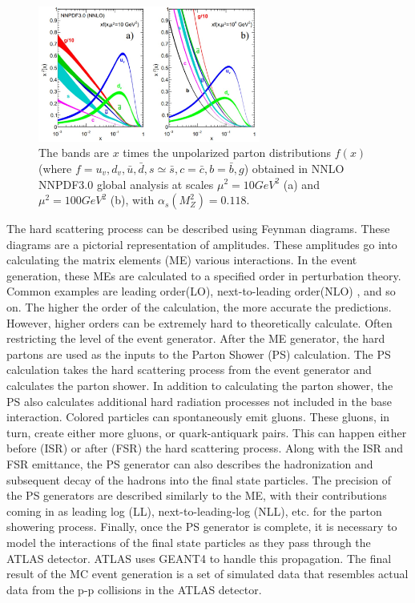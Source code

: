 \begin{figure}[h]
\begin{center}
\includegraphics*[width=0.65\textwidth] {figures/pdf.jpg}
\caption{The bands are ${x}$ times the unpolarized parton distributions
${f(x)}$ (where ${f = u_{v}, d_{v}, \bar{u}, \bar{d}, s \simeq{} \bar{s}, c = \bar{c}, b = \bar{b}, g}$) obtained in NNLO NNPDF3.0
global analysis at scales ${\mu^{2} = 10  GeV^{2}}$
(a) and ${\mu^{2} = 100  GeV^{2}}$ (b), with
${\alpha_{s}(M^{2}_{Z}) = 0.118}$.}
\label{fig:pdf}
\end{center}
\end{figure}


\indent The hard scattering process can be described using Feynman diagrams. These diagrams are a pictorial representation of amplitudes. These amplitudes go into calculating the matrix elements (ME) various interactions. In the event generation, these MEs are calculated to a specified order in perturbation theory. Common examples are leading order(LO), next-to-leading order(NLO) , and so on. The higher the order of the calculation, the more accurate the predictions. However, higher orders can be extremely hard to theoretically calculate. Often restricting the level of the event generator. \newline
\indent  After the ME generator, the hard partons are used as the inputs to the Parton Shower (PS) calculation. The PS calculation takes the hard scattering process from the event generator and calculates the parton shower. In addition to calculating the parton shower, the PS also calculates additional hard radiation processes not included in the base interaction. Colored particles can spontaneously emit gluons. These gluons, in turn, create either more gluons, or quark-antiquark pairs. This can happen either before (ISR) or after (FSR) the hard scattering process. Along with the ISR and FSR emittance, the PS generator can also describes the hadronization and subsequent decay of the hadrons into the final state particles. The precision of the PS generators are described similarly to the ME, with their contributions coming in as leading log (LL), next-to-leading-log (NLL), etc. for the parton showering process. \newline
\indent Finally, once the PS generator is complete, it is necessary to model the interactions of the final state particles as they pass through the ATLAS detector. ATLAS uses GEANT4  to handle this propagation\cite{geant4}. \newline
\indent The final result of the MC event generation is a set of simulated data that resembles actual data from the p-p collisions in the ATLAS detector. 
